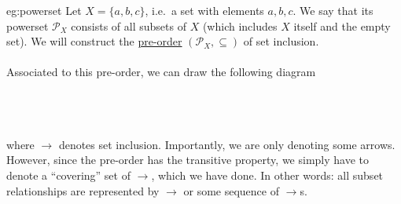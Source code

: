 \begin{eg}{eg:powerset}
    Let \( X = \{ a, b, c \} \), i.e.\ a set with elements \( a, b, c \).
    We say that its powerset \( \mathcal{P}_{X} \) consists of all subsets of \( X \) (which includes \( X \) itself and the empty set).
    We will construct the \hyperref[dfn:pre-order]{pre-order} \( (\mathcal{P}_{X}, \subseteq) \) of set inclusion.
    \\ \\
    Associated to this pre-order, we can draw the following diagram
    \\ \\
    \\ \\
    where \( \longrightarrow \) denotes set inclusion.
    Importantly, we are only denoting some arrows.
    However, since the pre-order has the transitive property, we simply have to denote a ``covering'' set of \( \longrightarrow \), which we have done.
    In other words: all subset relationships are represented by \( \longrightarrow \) or some sequence of \( \longrightarrow \)s.
\end{eg}

